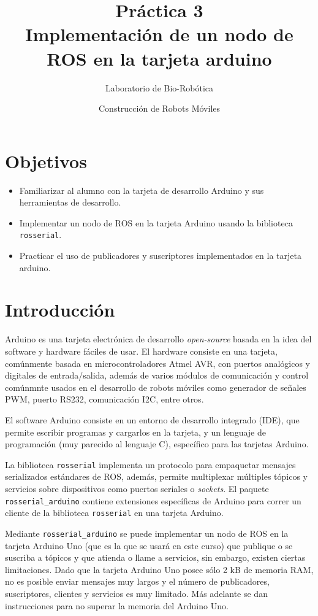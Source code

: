 \documentclass[letterpaper,12pt]{article}
\title{Práctica 3 \\ Implementación de un nodo de ROS en la tarjeta arduino}
\author{Laboratorio de Bio-Robótica}
\date{Construcción de Robots Móviles}
\begin{document}
\renewcommand{\tablename}{Tabla}
\maketitle
\section*{Objetivos}
\begin{itemize}
\item Familiarizar al alumno con la tarjeta de desarrollo Arduino y sus herramientas de desarrollo.
\item Implementar un nodo de ROS en la tarjeta Arduino usando la biblioteca \texttt{rosserial}.
\item Practicar el uso de publicadores y suscriptores implementados en la tarjeta arduino. 
\end{itemize}

\section{Introducción}

Arduino es una tarjeta electrónica de desarrollo \textit{open-source} basada en la idea del software y hardware fáciles de usar. El hardware consiste en una tarjeta, comúnmente basada en microcontroladores Atmel AVR, con puertos analógicos y digitales de entrada/salida, además de varios módulos de comunicación y control comúnmnte usados en el desarrollo de robots móviles como generador de señales PWM, puerto RS232, comunicación I2C, entre otros. 

El software Arduino consiste en un entorno de desarrollo integrado (IDE), que permite escribir programas y cargarlos en la tarjeta, y un lenguaje de programación (muy parecido al lenguaje C), específico para las tarjetas Arduino. 

La biblioteca \texttt{rosserial} implementa un protocolo para empaquetar mensajes serializados estándares de ROS, además, permite multiplexar múltiples tópicos y servicios sobre dispositivos como puertos seriales o \textit{sockets}. El paquete \texttt{rosserial\_arduino} contiene extensiones específicas de Arduino para correr un cliente de la biblioteca \texttt{rosserial} en una tarjeta Arduino.

Mediante \texttt{rosserial\_arduino} se puede implementar un nodo de ROS en la tarjeta Arduino Uno (que es la que se usará en este curso) que publique o se suscriba a tópicos y que atienda o llame a servicios, sin embargo, existen ciertas limitaciones. Dado que la tarjeta Arduino Uno posee sólo 2 kB de memoria RAM, no es posible enviar mensajes muy largos y el número de publicadores, suscriptores, clientes y servicios es muy limitado. Más adelante se dan instrucciones para no superar la memoria del Arduino Uno. 
\end{document}
